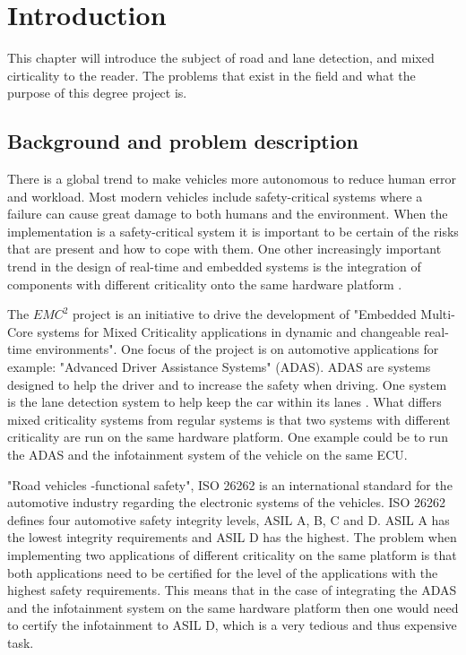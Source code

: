 \chapter{Introduction}
\label{sec:introduction}
This chapter will introduce the subject of road and lane detection, and mixed cirticality to the reader. The problems that exist in the field and what the purpose of this degree project is.


\section{Background and problem description}
There is a global trend to make vehicles more autonomous to reduce human error and workload. Most modern vehicles include safety-critical systems where a failure can cause great damage to both humans and the environment. When the implementation is a safety-critical system it is important to be certain of the risks that are present and how to cope with them. One other increasingly important trend in the design of real-time and embedded systems is the integration of components with different criticality onto the same hardware platform \cite{burns2013mixed}.
  


The $EMC^2$ project \cite{eu} is an initiative to drive the development of "Embedded Multi-Core systems for Mixed Criticality applications in dynamic and changeable real-time environments". One focus of the project is on automotive applications for example: "Advanced Driver Assistance Systems" (ADAS). ADAS are systems designed to help the driver and to increase the safety when driving. One system is the lane detection system to help keep the car within its lanes \cite{BarHillel2014}. What differs mixed criticality systems from regular systems is that two systems with different criticality are run on the same hardware platform. One example could be to run the ADAS and the infotainment system of the vehicle on the same ECU.


"Road vehicles -functional safety", ISO 26262 is an international standard for the automotive industry regarding the electronic systems of the vehicles. ISO 26262 defines four automotive safety integrity levels, ASIL A, B, C and D. ASIL A has the lowest integrity requirements and ASIL D has the highest. The problem when implementing two applications of different criticality on the same platform is that both applications need to be certified for the level of the applications with the highest safety requirements. This means that in the case of integrating the ADAS and the infotainment system on the same hardware platform then one would need to certify the infotainment to ASIL D, which is a very tedious and thus expensive task.

